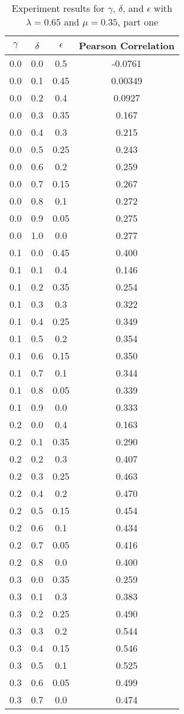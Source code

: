 \documentclass{article}
\begin{document}
\begin{table}[h!]
\centering
\begin{tabular}{|c|c|c||c|}
	\hline
	$\gamma$ & $\delta$ & $\epsilon$ & Pearson Correlation \\
	\hline
	\hline
	0.0 & 0.0 & 0.5 & -0.0761 \\
	0.0 & 0.1 & 0.45 & 0.00349 \\
	0.0 & 0.2 & 0.4 & 0.0927 \\
	0.0 & 0.3 & 0.35 & 0.167 \\
	0.0 & 0.4 & 0.3 & 0.215 \\ 
	0.0 & 0.5 & 0.25 & 0.243 \\
	0.0 & 0.6 & 0.2 & 0.259 \\
	0.0 & 0.7 & 0.15 & 0.267 \\
	0.0 & 0.8 & 0.1 & 0.272 \\
	0.0 & 0.9 & 0.05 & 0.275 \\
	0.0 & 1.0 & 0.0 & 0.277 \\
	\hline
	0.1 & 0.0 & 0.45 & 0.400 \\
	0.1 & 0.1 & 0.4 & 0.146 \\
	0.1 & 0.2 & 0.35 & 0.254 \\
	0.1 & 0.3 & 0.3 & 0.322 \\
	0.1 & 0.4 & 0.25 & 0.349 \\
	0.1 & 0.5 & 0.2 & 0.354 \\
	0.1 & 0.6 & 0.15 & 0.350 \\
	0.1 & 0.7 & 0.1 & 0.344 \\
	0.1 & 0.8 & 0.05 & 0.339 \\
	0.1 & 0.9 & 0.0 & 0.333 \\
	\hline
	0.2 & 0.0 & 0.4 & 0.163 \\
	0.2 & 0.1 & 0.35 & 0.290 \\
	0.2 & 0.2 & 0.3 & 0.407 \\
	0.2 & 0.3 & 0.25 & 0.463 \\
	0.2 & 0.4 & 0.2 & 0.470 \\
	0.2 & 0.5 & 0.15 & 0.454 \\
	0.2 & 0.6 & 0.1 & 0.434 \\
	0.2 & 0.7 & 0.05 & 0.416 \\
	0.2 & 0.8 & 0.0 & 0.400 \\
	\hline
	0.3 & 0.0 & 0.35 & 0.259 \\
	0.3 & 0.1 & 0.3 & 0.383 \\
	0.3 & 0.2 & 0.25 & 0.490 \\
	0.3 & 0.3 & 0.2 & 0.544 \\
	0.3 & 0.4 & 0.15 & 0.546 \\
	0.3 & 0.5 & 0.1 & 0.525 \\
	0.3 & 0.6 & 0.05 & 0.499 \\
	0.3 & 0.7 & 0.0 & 0.474 \\
	\hline
\end{tabular}
\caption{Experiment results for $\gamma$, $\delta$, and $\epsilon$ with $\lambda = 0.65$ and $\mu = 0.35$, part one}
\label{table:gammaresults1}
\end{table}
\end{document}
